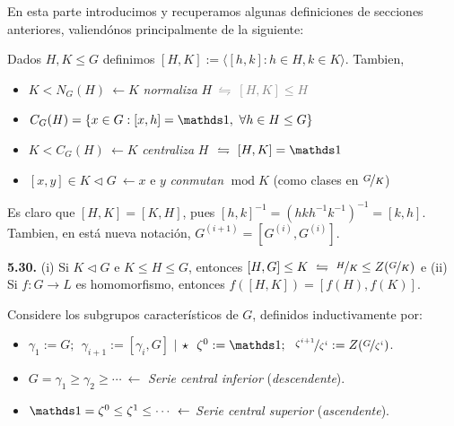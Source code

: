 En esta parte introducimos y recuperamos algunas definiciones de secciones anteriores, valiendónos principalmente de la siguiente: 
\begin{definition}
    Dados \(H,K \leq G\) definimos \(\displaystyle [H,K]:= \langle[h,k] : h \in H, k \in K \rangle\). Tambien, 
    \vspace{-0.3cm}
\begin{itemize}[label = \(\star\), left = 1cm]
    \item \(K < N_G(H) \ \leftarrow K\) \emph{normaliza} \(H\)\textcolor{gray}{\( \  \leftrightharpoons \ [H,K ] \leq H\)}
    \item \(C_G(H)= \{x \in G : [x,h] = \id, \ \forall h \in H\leq G\}\) 
    \item \(K < C_G(H) \  \leftarrow  K \) \emph{centraliza} \(H\) \textcolor{gray}{\( \  \leftrightharpoons \ [H,K ] = \id\)}
    \item \([x,y] \in K \lhd G \  \leftarrow  x  \) e \(y\) \emph{conmutan} \(\operatorname{mod}  K \) (como clases en \(\nicefrac{G}{K}\))
\end{itemize}
\end{definition}

\begin{note}
    Es claro que \([H,K] = [K,H]\), pues \([h,k]^{-1} = (hkh^{-1}k^{-1})^{-1} = [k,h] \). Tambien, en está nueva notación, \(G^{(i+1)} = [G^{(i)},G^{(i)}]\). 
\end{note}

\hypertarget{lemma530}{}
\begin{lemma}
    \textbf{5.30.} (i) Si \(K \lhd G\) e \(K \leq H \leq G\), entonces \([H,G] \leq K \ \leftrightharpoons \ \nicefrac{H}{K} \leq Z(\nicefrac{G}{K})\) e (ii) Si  \(f : G \to L\) es homomorfismo, entonces \(f([H,K]) = [f(H), f(K)]\).   
\end{lemma}


\begin{definition}
    Considere los subgrupos característicos de \(G\), definidos inductivamente por:
    \vspace{-0.33cm}
    \begin{itemize}[label = \(\star\), left=1cm]
        \item \(\gamma_1 := G; \ \  \gamma_{i+1} := [\gamma_i, G]\) \hfill \(\mid\) \hfill \(\star \ \ \zeta^0 := \id; \ \  \nicefrac{\zeta^{i+1}}{\zeta^i} := Z(\nicefrac{G}{\zeta^i})\). %
        \item\( G = \gamma_1 \geq \gamma_2 \geq \cdots \ \leftarrow \) \emph{Serie central inferior} (\emph{descendente}).
        \item \(\id = \zeta^0 \leq \zeta^1 \leq \cdots \ \leftarrow \) \emph{Serie central superior} (\emph{ascendente}).
    \end{itemize}
\end{definition}

